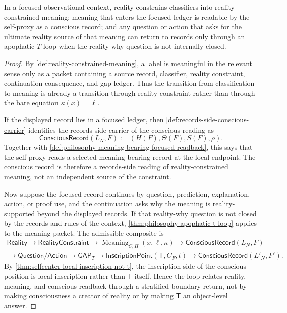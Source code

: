 \begin{theorem}
\label{thm:philosophy-reality-meaning-consciousness-relation}
In a focused observational context, reality constrains classifiers into
reality-constrained meaning; meaning that enters the focused ledger is
readable by the self-proxy as a conscious record; and any question or
action that asks for the ultimate reality source of that meaning can
return to records only through an apophatic $T$-loop when the
reality-why question is not internally closed.
\end{theorem}
\begin{proof}
By \autoref{def:reality-constrained-meaning}, a label is meaningful in
the relevant sense only as a packet containing a source record,
classifier, reality constraint, continuation consequence, and gap
ledger. Thus the transition from classification to meaning is already a
transition through reality constraint rather than through the bare
equation $\kappa(x)=\ell$.

If the displayed record lies in a focused ledger, then
\autoref{def:records-side-conscious-carrier} identifies the records-side
carrier of the conscious reading as
$$
\mathsf{ConsciousRecord}(L_N,F)
:=
(H(F),\Theta(F),S(F),\rho).
$$
Together with
\autoref{def:philosophy-meaning-bearing-focused-readback}, this says
that the self-proxy reads a selected meaning-bearing record at the local
endpoint. The conscious record is therefore a records-side reading of
reality-constrained meaning, not an independent source of the
constraint.

Now suppose the focused record continues by question, prediction,
explanation, action, or proof use, and the continuation asks why the
meaning is reality-supported beyond the displayed records. If that
reality-why question is not closed by the records and rules of the
context, \autoref{thm:philosophy-apophatic-t-loop} applies to the
meaning packet. The admissible composite is
$$
\begin{gathered}
\mathsf{Reality}
\longrightarrow
\mathsf{RealityConstraint}
\longrightarrow
\operatorname{Meaning}_{C,\Pi}(x,\ell,\kappa)
\longrightarrow
\mathsf{ConsciousRecord}(L_N,F)\\
\longrightarrow
\mathsf{Question}/\mathsf{Action}
\longrightarrow
\mathsf{GAP}_{T}
\longrightarrow
\mathsf{InscriptionPoint}(\mathsf{T},C_F,t)
\longrightarrow
\mathsf{ConsciousRecord}(L'_N,F').
\end{gathered}
$$
By \autoref{thm:selfcenter-local-inscription-not-t}, the inscription
side of the conscious position is local inscription rather than
$\mathsf{T}$ itself. Hence the loop relates reality, meaning, and
conscious readback through a stratified boundary return, not by making
consciousness a creator of reality or by making $\mathsf{T}$ an
object-level answer.
\end{proof}


